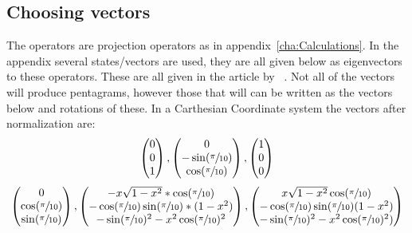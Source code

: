 \subsection{Choosing vectors}\label{subsec:Choosing vectors}
The operators are projection operators as in  appendix~\ref{cha:Calculations}. 
In the appendix several states/vectors are used, they are all given below as eigenvectors to these operators. These are all given in the article by ~\cite{Kochen1968The}. Not all of the vectors will produce pentagrams, however those that will can be written as the vectors below and rotations of these.
In a Carthesian Coordinate system the vectors after normalization are:
\\
\begin{equation*}
\begin{pmatrix}
0\\
0\\
1\\
\end{pmatrix}
,
\begin{pmatrix}
0\\
-\sin(\sfrac{\pi}{10})\\
\cos(\sfrac{\pi}{10})
\end{pmatrix}
,
\begin{pmatrix}
1\\
0\\
0\\
\end{pmatrix}
\end{equation*}
\begin{equation*}
\begin{pmatrix}
0\\
\cos(\sfrac{\pi}{10})\\
\sin(\sfrac{\pi}{10})\\
\end{pmatrix}
,
\begin{pmatrix}
-x\sqrt{1-x^2}*\cos(\sfrac{\pi}{10})\\
-\cos(\sfrac{\pi}{10})\sin(\sfrac{\pi}{10})*(1-x^2)\\
-\sin(\sfrac{\pi}{10})^2-x^2\cos(\sfrac{\pi}{10})^2\\
\end{pmatrix}
,
\begin{pmatrix}
x\sqrt{1-x^2}\cos(\sfrac{\pi}{10})\\
-\cos(\sfrac{\pi}{10})\sin(\sfrac{\pi}{10})(1-x^2)\\
-\sin(\sfrac{\pi}{10})^2-x^2\cos(\sfrac{\pi}{10})^2)\\
\end{pmatrix}
\end{equation*}
